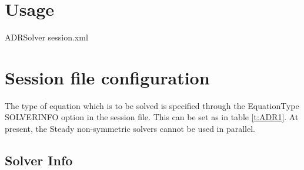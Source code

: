 \section{Usage}

ADRSolver session.xml

\section{Session file configuration}

The type of equation which is to be solved is specified through the EquationType 
SOLVERINFO option in the session file. This can be set as in table \ref{t:ADR1}.
At present, the Steady non-symmetric solvers cannot be used in parallel. \\

\subsection{Solver Info}

